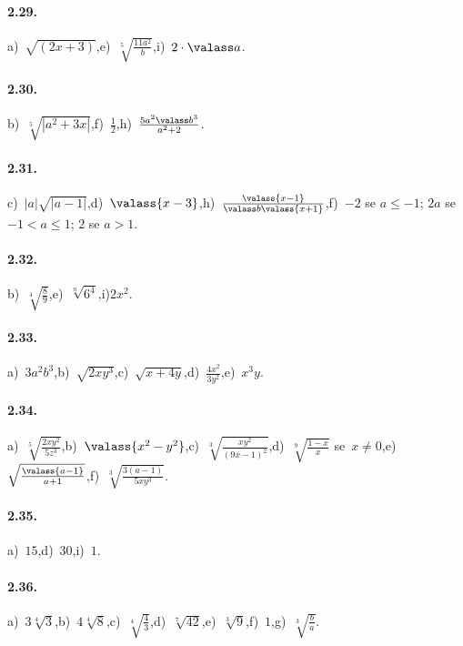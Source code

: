 \paragraph{2.29.}
a)~$\sqrt{(2x+3)}$,\quad e)~$\sqrt[5]{\frac{11a^2} b}$,\quad i)~$2\cdot \valass a$.

\paragraph{2.30.}
b)~$\sqrt[5]{\left|a^2+3x\right|}$,\quad f)~$\frac 1 2$,\quad h)~$\frac{5a^2\valass b^3}{a^2+2}$.

\paragraph{2.31.}
c)~$\left|a\right|\sqrt{\left|a-1\right|}$,\quad d)~$\valass{x-3}$,\quad h)~$\frac{\valass{x-1}}{\valass b \valass{x+1}}$,\quad f)~$-2$ se $a\le-1$; $2a$ se $-1<a\le 1$; $2$ se $a>1$.

\paragraph{2.32.}
b)~$\sqrt[4]{\frac 8 9}$,\quad e)~$\sqrt[n]{6^4}$,\quad i)$2x^2$.

\paragraph{2.33.}
a)~$3a^2b^3$,\quad b)~$\sqrt{2xy^3}$,\quad c)~$\sqrt{x+4y}$,\quad d)~$\frac{4x^2}{3y^2}$,\quad e)~$x^3y$.

\paragraph{2.34.}
a)~$\sqrt[5]{\frac{2xy^2}{5z^3}}$,\quad b)~$\valass{x^2-y^2}$,\quad c)~$\sqrt[3]{\frac{xy^2}{(9x-1)^2}}$,\quad d)~$\sqrt[9]{\frac{1-x}{x}}$ se~$x\neq 0$,\quad e)~$\sqrt{\frac{\valass{a-1}}{a+1}}$,\quad f)~$\sqrt[3]{\frac{3(a-1)}{5xy^3}}$.

\paragraph{2.35.}
a)~$15$,\quad d)~$30$,\quad i)~$1$.

\paragraph{2.36.}
a)~$3\sqrt[4]{3}$,\quad b)~$4\sqrt[4]{8}$,\quad c)~$\sqrt[4]{\frac{4}{3}}$,\quad d)~$\sqrt[7]{42}$,\quad e)~$\sqrt[3]{9}$,\quad f)~$1$,\quad g)~$\sqrt[3]{\frac{b}{a}}$.

